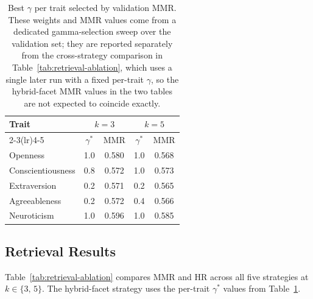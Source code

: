 \documentclass[../main.tex]{subfiles}
\begin{document}
\begin{table}[htbp]
  \centering
  \caption{Best $\gamma$ per trait selected by validation MMR. These weights and
    MMR values come from a dedicated gamma-selection sweep over the validation
    set; they are reported separately from the cross-strategy comparison in
    Table~\ref{tab:retrieval-ablation}, which uses a single later run with a
    fixed per-trait $\gamma$, so the hybrid-facet MMR values in the two tables
    are not expected to coincide exactly.}
  \label{tab:best-gamma}
  \small
  \begin{tabular}{lcccc}
    \toprule
    \textbf{Trait} & \multicolumn{2}{c}{$k=3$} & \multicolumn{2}{c}{$k=5$} \\
    \cmidrule(lr){2-3}\cmidrule(lr){4-5}
     & $\gamma^*$ & MMR & $\gamma^*$ & MMR \\
    \midrule
    Openness          & 1.0 & 0.580 & 1.0 & 0.568 \\
    Conscientiousness & 0.8 & 0.572 & 1.0 & 0.573 \\
    Extraversion      & 0.2 & 0.571 & 0.2 & 0.565 \\
    Agreeableness     & 0.2 & 0.572 & 0.4 & 0.566 \\
    Neuroticism       & 1.0 & 0.596 & 1.0 & 0.585 \\
    \bottomrule
  \end{tabular}
\end{table}

\subsection{Retrieval Results}

Table~\ref{tab:retrieval-ablation} compares MMR and HR across all five
strategies at $k \in \{3,\,5\}$.
The hybrid-facet strategy uses the per-trait $\gamma^*$ values from
Table~\ref{tab:best-gamma}.
\end{document}
